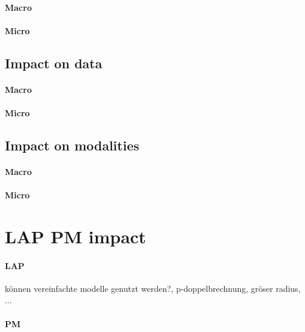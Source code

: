 \paragraph{Macro}
\paragraph{Micro}
% 
\subsection{Impact on data}
%
\begin{figure}[!tb]
\centering
{}
\caption{}
\label{fig:foo_p_zoom}
\end{figure}
% 
\begin{figure}[!tb]
\centering
{}
\caption{}
\label{fig:foo_r}
\end{figure}
% 
\begin{figure}[!tb]
\centering
{}
\caption{}
\label{fig:foo_r_zoom}
\end{figure}
% 
\begin{figure}[!tb]
\centering
{}
\caption{}
\label{fig:foo_p_noise}
\end{figure}
% 
\begin{figure}[!tb]
\centering
{}
\caption{}
\label{fig:foo_r_noise}
\end{figure}
% 
\paragraph{Macro}
\paragraph{Micro}
% 
\subsection{Impact on modalities}
\paragraph{Macro}
\paragraph{Micro}
% 
\section{LAP PM impact}
\paragraph{LAP}
können vereinfachte modelle genutzt werden?, p-doppelbrechnung, gröser radius, ...
\paragraph{PM}
% 